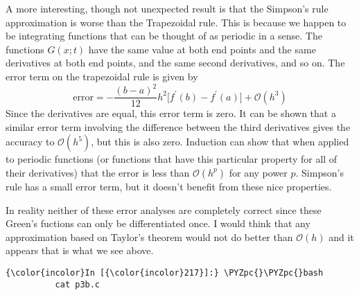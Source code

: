\documentclass[11pt]{article}
\def\PYZpc{\char`\%}
\begin{document}
A more interesting, though not unexpected result is that the Simpson's
rule approximation is worse than the Trapezoidal rule. This is because
we happen to be integrating functions that can be thought of as periodic
in a sense. The functions \(G(x;t)\) have the same value at both end
points and the same derivatives at both end points, and the same second
derivatives, and so on. The error term on the trapezoidal rule is given
by \[
\text{error} = -\frac{(b-a)^2}{12}h^2 \big[ f^\prime(b)-f^\prime(a) \big] + \mathcal{O}(h^3)
\] Since the derivatives are equal, this error term is zero. It can be
shown that a similar error term involving the difference between the
third derivatives gives the accuracy to \(\mathcal{O}(h^5)\), but this
is also zero. Induction can show that when applied to periodic functions
(or functions that have this particular property for all of their
derivatives) that the error is less than \(\mathcal{O}(h^p)\) for any
power \(p\). Simpson's rule has a small error term, but it doesn't
benefit from these nice properties.

In reality neither of these error analyses are completely correct since
these Green's fuctions can only be differentiated once. I would think
that any approximation based on Taylor's theorem would not do better
than \(\mathcal{O}(h)\) and it appears that is what we see above.

    \begin{Verbatim}[commandchars=\\\{\}]
{\color{incolor}In [{\color{incolor}217}]:} \PYZpc{}\PYZpc{}bash 
          cat p3b.c
\end{Verbatim}
\end{document}
